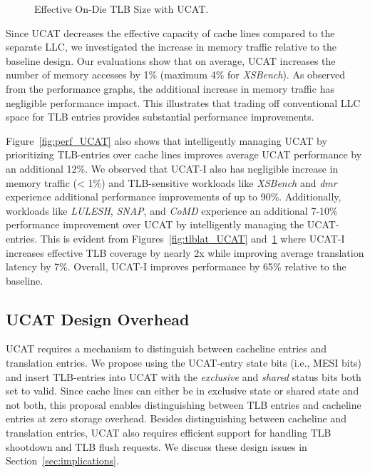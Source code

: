 \begin{figure}[b]
  \vspace{0.2in} \centering
  \centerline{}

  \caption{\small Effective On-Die TLB Size with UCAT.\normalsize}
  \label{fig:tlbsize_UCAT} 
  \vspace{-0.0 in}
\end{figure}

Since UCAT decreases the effective capacity of cache lines compared to
the separate LLC, we investigated the increase in memory traffic
relative to the baseline design. Our evaluations show that on average,
UCAT increases the number of memory accesses by 1\% (maximum 4\% for
{\em XSBench}). As observed from the performance graphs, the
additional increase in memory traffic has negligible performance
impact. This illustrates that trading off conventional LLC space for
TLB entries provides substantial performance improvements.

Figure~\ref{fig:perf_UCAT} also shows that intelligently managing UCAT
by prioritizing TLB-entries over cache lines improves average UCAT
performance by an additional 12\%. We observed that UCAT-I also has
negligible increase in memory traffic (< 1\%) and TLB-sensitive
workloads like {\em XSBench} and {\em dmr} experience additional
performance improvements of up to 90\%. Additionally, workloads like
{\em LULESH}, {\em SNAP}, and {\em CoMD} experience an additional
7-10\% performance improvement over UCAT by intelligently managing the
UCAT-entries. This is evident from Figures~\ref{fig:tlblat_UCAT}
and~\ref{fig:tlbsize_UCAT} where UCAT-I increases effective TLB
coverage by nearly 2x while improving average translation latency by
7\%. Overall, UCAT-I improves performance by 65\% relative to the
baseline.

\subsection{UCAT Design Overhead}

\noindent UCAT requires a mechanism to distinguish between cacheline
entries and translation entries. We propose using the UCAT-entry state
bits (i.e., MESI bits) and insert TLB-entries into UCAT with the {\em
exclusive} and {\em shared} status bits both set to valid. Since cache
lines can either be in exclusive state or shared state and not both,
this proposal enables distinguishing between TLB entries and cacheline
entries at zero storage overhead. Besides distinguishing between
cacheline and translation entries, UCAT also requires efficient
support for handling TLB shootdown and TLB flush requests. We discuss
these design issues in Section~\ref{sec:implications}.

